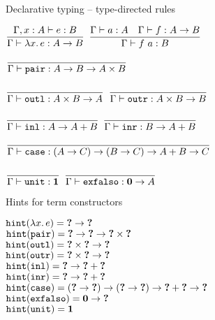 \documentclass{beamer}
\begin{document}
\begin{frame}{Declarative typing -- type-directed rules}

\begin{center}
  $\displaystyle \frac{\Gamma, x : A \vdash e : B}{\Gamma \vdash \lambda x.\, e : A \to B} \textsc{\footnotesize{}}$ \quad
  $\displaystyle \frac{\Gamma \vdash a : A \quad \Gamma \vdash f : A \to B}{\Gamma \vdash f\ a : B} \textsc{\footnotesize{}}$

  \vspace{2em}

  $\displaystyle \frac{}{\Gamma \vdash \texttt{pair} : A \to B \to A \times B} \textsc{\footnotesize{}}$

  \vspace{1em}

  $\displaystyle \frac{}{\Gamma \vdash \texttt{outl} : A \times B \to A} \textsc{\footnotesize{}}$ \quad
  $\displaystyle \frac{}{\Gamma \vdash \texttt{outr} : A \times B \to B} \textsc{\footnotesize{}}$

  \vspace{2em}

  $\displaystyle \frac{}{\Gamma \vdash \texttt{inl} : A \to A + B} \textsc{\footnotesize{}}$ \quad
  $\displaystyle \frac{}{\Gamma \vdash \texttt{inr} : B \to A + B} \textsc{\footnotesize{}}$

  \vspace{2em}

  $\displaystyle \frac{}{\Gamma \vdash \texttt{case} : (A \to C) \to (B \to C) \to A + B \to C} \textsc{\footnotesize{}}$

  \vspace{2em}

  $\displaystyle \frac{}{\Gamma \vdash \texttt{unit} : \textbf{1}} \textsc{\footnotesize{}}$ \quad
  $\displaystyle \frac{}{\Gamma \vdash \texttt{exfalso} : \textbf{0} \to A} \textsc{\footnotesize{}}$
\end{center}

\end{frame}

\begin{frame}{Hints for term constructors}

\begin{center}
  $\texttt{hint}(\lambda x.\, e) = \textbf{?} \to \textbf{?}$ \\
  $\texttt{hint}(\texttt{pair}) = \textbf{?} \to \textbf{?} \to \textbf{?} \times \textbf{?}$ \\
  $\texttt{hint}(\texttt{outl}) = \textbf{?} \times \textbf{?} \to \textbf{?}$ \\
  $\texttt{hint}(\texttt{outr}) = \textbf{?} \times \textbf{?} \to \textbf{?}$ \\
  $\texttt{hint}(\texttt{inl}) = \textbf{?} \to \textbf{?} + \textbf{?}$ \\
  $\texttt{hint}(\texttt{inr}) = \textbf{?} \to \textbf{?} + \textbf{?}$ \\
  $\texttt{hint}(\texttt{case}) = (\textbf{?} \to \textbf{?}) \to (\textbf{?} \to \textbf{?}) \to \textbf{?} + \textbf{?} \to \textbf{?}$ \\
  $\texttt{hint}(\texttt{exfalso}) = \textbf{0} \to \textbf{?}$ \\
  $\texttt{hint}(\texttt{unit}) = \textbf{1}$
\end{center}

\end{frame}
\end{document}
